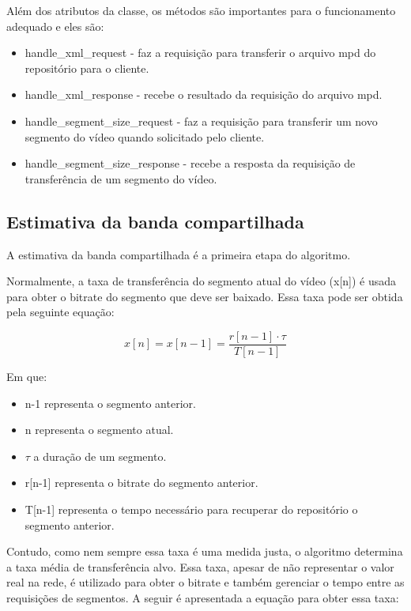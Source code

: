 \documentclass[10pt,twocolumn,letterpaper]{article}
\begin{document}
Além dos atributos da classe, os métodos são importantes para o funcionamento adequado e eles são:

\begin{itemize}
  \item handle\_xml\_request - faz a requisição para transferir o arquivo mpd do repositório para o cliente.
  \item handle\_xml\_response - recebe o resultado da requisição do arquivo mpd.
  \item handle\_segment\_size\_request - faz a requisição para transferir um novo segmento do vídeo quando solicitado pelo cliente.
  \item handle\_segment\_size\_response - recebe a resposta da requisição de transferência de um segmento do vídeo.
\end{itemize}


\subsection{Estimativa da banda compartilhada}

A estimativa da banda compartilhada é a primeira etapa do algoritmo.

Normalmente, a taxa de transferência do segmento atual do vídeo (x[n]) é usada para obter o bitrate do segmento que deve ser baixado. Essa taxa pode ser obtida pela seguinte equação:

\begin{equation} \label{actual_throughput}
x[n] = x[n-1] = \frac{r[n-1] \cdot \tau}{T[n-1]} 
\end{equation}

Em que:
\begin{itemize}
  \item n-1 representa o segmento anterior.
  \item n representa o segmento atual.
  \item $\tau$ a duração de um segmento.
  \item r[n-1] representa o bitrate do segmento anterior.
  \item T[n-1] representa o tempo necessário para recuperar do repositório o segmento anterior.
\end{itemize}

Contudo, como nem sempre essa taxa é uma medida justa, o algoritmo determina a taxa média de transferência alvo. Essa taxa, apesar de não representar o valor real na rede, é utilizado para obter o bitrate e também gerenciar o tempo entre as requisições de segmentos. A seguir é apresentada a equação para obter essa taxa:
\end{document}
